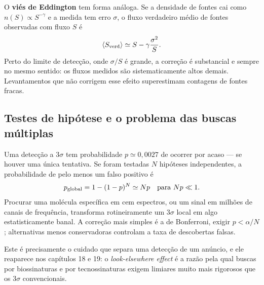 \documentclass[11pt,a4paper]{article}
\begin{document}
O \textbf{viés de Eddington} tem forma análoga. Se a densidade de fontes cai como $n(S)\propto S^{-\gamma}$ e a medida tem erro $\sigma$, o fluxo verdadeiro médio de fontes observadas com fluxo $S$ é
\[
\langle S_{\rm verd}\rangle\simeq S-\gamma\frac{\sigma^{2}}{S}.
\]
Perto do limite de detecção, onde $\sigma/S$ é grande, a correção é substancial e sempre no mesmo sentido: os fluxos medidos são sistematicamente altos demais. Levantamentos que não corrigem esse efeito superestimam contagens de fontes fracas.

\subsection*{Testes de hipótese e o problema das buscas múltiplas}

Uma detecção a $3\sigma$ tem probabilidade $p\simeq0{,}0027$ de ocorrer por acaso --- se houver uma única tentativa. Se foram testadas $N$ hipóteses independentes, a probabilidade de pelo menos um falso positivo é
\[
p_{\rm global}=1-(1-p)^{N}\simeq Np\quad\text{para}\ Np\ll1.
\]
Procurar uma molécula específica em cem espectros, ou um sinal em milhões de canais de frequência, transforma rotineiramente um $3\sigma$ local em algo estatisticamente banal. A correção mais simples é a de Bonferroni, exigir $p<\alpha/N$; alternativas menos conservadoras controlam a taxa de descobertas falsas.

Este é precisamente o cuidado que separa uma detecção de um anúncio, e ele reaparece nos capítulos 18 e 19: o \textit{look-elsewhere effect} é a razão pela qual buscas por biossinaturas e por tecnossinaturas exigem limiares muito mais rigorosos que os $3\sigma$ convencionais.
\end{document}
